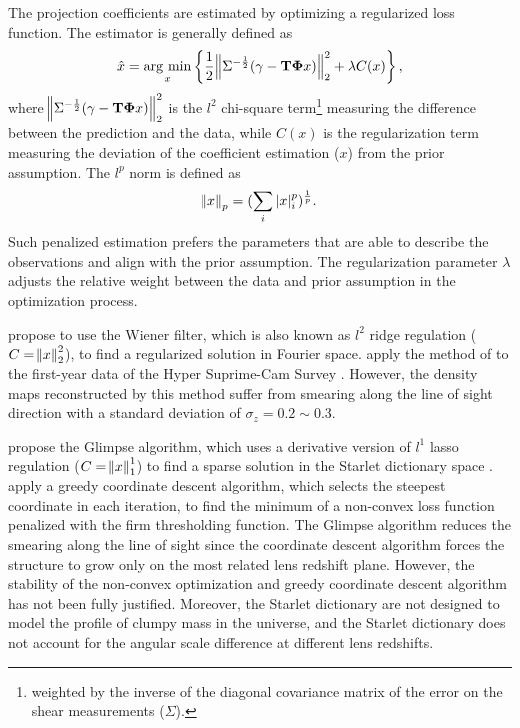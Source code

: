 \documentclass[twocolumn]{aastex62}
\newcommand{\argmin}{\mathop{\rm arg~min}\limits}
\begin{document}
The projection coefficients are estimated by optimizing a regularized loss
function. The estimator is generally defined as
\begin{equation}
\hat{x}=\argmin_{x} \left\{ \frac{1}{2}\norm{\Sigma^{-\frac{1}{2}}(\gamma-
\mathbf{T\Phi} x)}_2^2+ \lambda C(x) \right\},
\end{equation}
where $\norm{\Sigma^{-\frac{1}{2}}(\gamma - \mathbf{T\Phi} x)}_2^2$ is the
$l^2$ chi-square term\footnote{weighted by the inverse of the diagonal
covariance matrix of the error on the shear measurements ($\Sigma$).} measuring
the difference between the prediction and the data, while $C(x)$ is the
regularization term measuring the deviation of the coefficient estimation
($x$) from the prior assumption. The $l^p$ norm is defined as
\begin{equation}
\norm{x}_p=(\sum_{i} |x|^p_i)^{\frac{1}{p}}.
\end{equation}
Such penalized estimation prefers the parameters that are able to describe the
observations and align with the prior assumption. The regularization
parameter $\lambda$ adjusts the relative weight between the data and
prior assumption in the optimization process.

\citet{LSS-massMap-Wiener-Simon2009} propose to use the Wiener filter, which is
also known as $l^2$ ridge regulation ($C=\norm{x}^2_2$), to find a regularized
solution in Fourier space. \citet{HSC1-massMaps} apply the method of
\citet{LSS-massMap-Wiener-Simon2009} to the first-year data of the Hyper
Suprime-Cam Survey \citep{HSC1-data}.  However, the density maps reconstructed
by this method suffer from smearing along the line of sight direction with a
standard deviation of $\sigma_z=0.2 \sim 0.3$.

\citet{LSS-massMap-Glimpse3D-Leonard2014} propose the Glimpse algorithm, which
uses a derivative version of $l^1$ lasso regulation ($C=\norm{x}^1_1$) to find
a sparse solution in the Starlet dictionary space \citep{Starlet-Starck2015}.
\citet{LSS-massMap-Glimpse3D-Leonard2014} apply a greedy coordinate descent
algorithm, which selects the steepest coordinate in each iteration, to find the
minimum of a non-convex loss function penalized with the firm thresholding
function. The Glimpse algorithm reduces the smearing along the line of sight
since the coordinate descent algorithm forces the structure to grow only on the
most related lens redshift plane.  However, the stability of the non-convex
optimization and greedy coordinate descent algorithm has not been fully
justified. Moreover, the Starlet dictionary are not designed to model the
profile of clumpy mass in the universe, and the Starlet dictionary does not
account for the angular scale difference at different lens redshifts.
\end{document}
